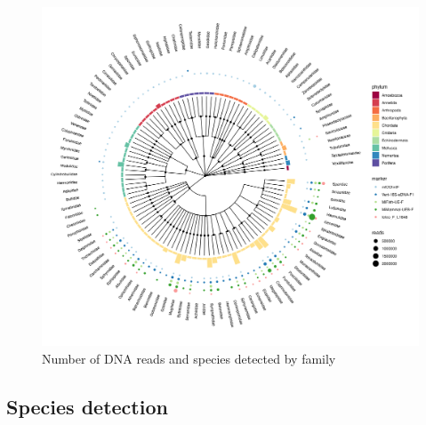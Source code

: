 \documentclass[10pt]{article}
\begin{document}
\begin{figure}[h!]
\centering
\includegraphics[width=\textwidth]{tree}
\caption{Number of DNA reads and species detected by family}
\end{figure}

\begin{multicols}{2}
\blindtext
\blindtext
\end{multicols}

\clearpage

\subsection*{Species detection}
\end{document}
